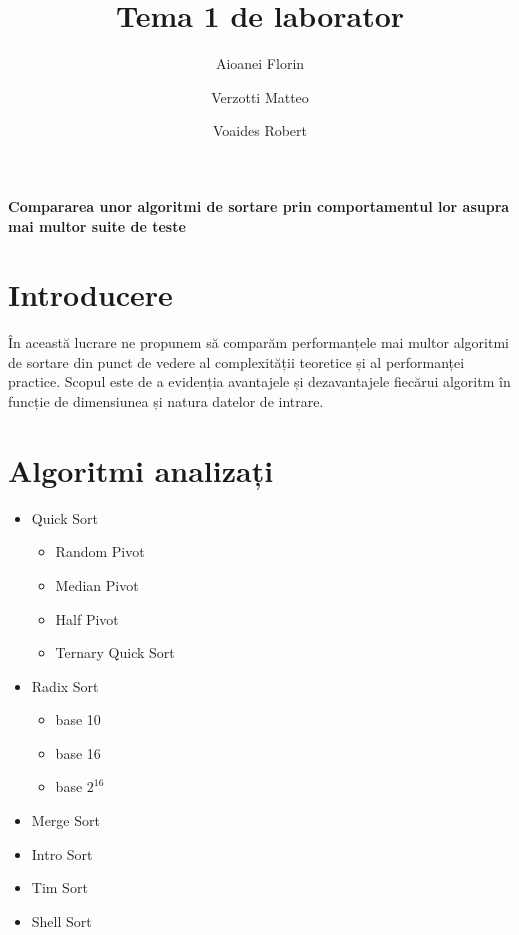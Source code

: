 \documentclass[12pt]{article}
\title{\textbf{Tema 1 de laborator}}
\author{Aioanei Florin \and Verzotti Matteo \and Voaides Robert}
\date{}
\begin{document}
\maketitle

\begin{center}
    \textbf{Compararea unor algoritmi de sortare prin comportamentul lor asupra mai multor suite de teste}\\
\end{center}

\vspace{1cm}

\tableofcontents
\newpage

\section{Introducere}

În această lucrare ne propunem să comparăm performanțele mai multor algoritmi de sortare din punct de vedere al complexității teoretice și al performanței practice. Scopul este de a evidenția avantajele și dezavantajele fiecărui algoritm în funcție de dimensiunea și natura datelor de intrare.

\section{Algoritmi analizați}

\begin{itemize}
    \item Quick Sort
    \begin{itemize}
        \item Random Pivot
        \item Median Pivot
        \item Half Pivot
        \item Ternary Quick Sort
    \end{itemize}
    \item Radix Sort
    \begin{itemize}
        \item base 10
        \item base 16
        \item base $2^{16}$
    \end{itemize}
    \item Merge Sort
    \item Intro Sort
    \item Tim Sort
    \item Shell Sort
\end{itemize}
\end{document}
